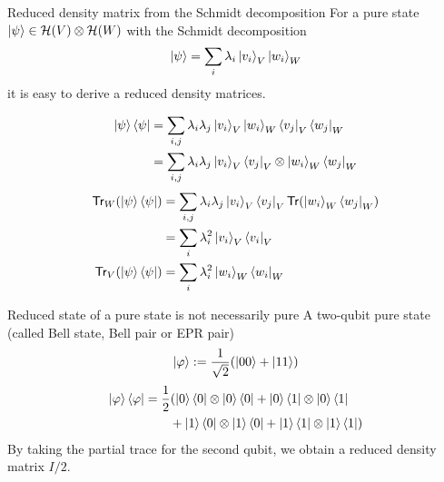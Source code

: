 \documentclass[10pt]{beamer}
\newcommand{\Tr}{\mathsf{Tr}}
\newcommand\emm[1]{\textcolor{redorange}{{#1}}}
\begin{document}
\begin{frame}{Reduced density matrix from the Schmidt decomposition}
For a pure state $\ket{\psi}\in\mathcal{H}(V)\otimes\mathcal{H}(W)$ with the \emm{Schmidt decomposition}
\begin{equation*}
\ket{\psi}=\sum_i\lambda_i \ket{v_i}_V\ket{w_i}_W
\end{equation*}
it is easy to derive a \emm{reduced density matrices}.

\begin{align*}
\ket{\psi}\bra{\psi}&=\sum_{i,j}\lambda_i\lambda_j \ket{v_i}_V\ket{w_i}_W\bra{v_j}_V\bra{w_j}_W\\
&=\sum_{i,j}\lambda_i\lambda_j \ket{v_i}_V\bra{v_j}_V\otimes \ket{w_i}_W\bra{w_j}_W
\end{align*}
\begin{align*}
\Tr_W(\ket{\psi}\bra{\psi})&=\sum_{i,j}\lambda_i\lambda_j \ket{v_i}_V\bra{v_j}_V\Tr(\ket{w_i}_W\bra{w_j}_W)\\
&=\sum_i\lambda_i^2 \ket{v_i}_V\bra{v_i}_V\\
\Tr_V(\ket{\psi}\bra{\psi}) &=\sum_i\lambda_i^2 \ket{w_i}_W\bra{w_i}_W
\end{align*}
\end{frame}

\begin{frame}{Reduced state of a pure state is not necessarily pure}
A two-qubit pure state (called Bell state, Bell pair or EPR pair)
\begin{align*}
\ket{\varphi} := \frac1{\sqrt{2}}(\ket{00}+\ket{11})
\end{align*}
\begin{align*}
\ket{\varphi}\bra{\varphi}&=\frac12(\ket{0}\bra{0}\otimes \ket{0}\bra{0} + \ket{0}\bra{1}\otimes \ket{0}\bra{1} \\
&\qquad + \ket{1}\bra{0}\otimes \ket{1}\bra{0} + \ket{1}\bra{1}\otimes \ket{1}\bra{1} )
\end{align*}
By taking the partial trace for the second qubit, we obtain a reduced density matrix $I/2$.
\end{frame}
\fi

\end{document}

